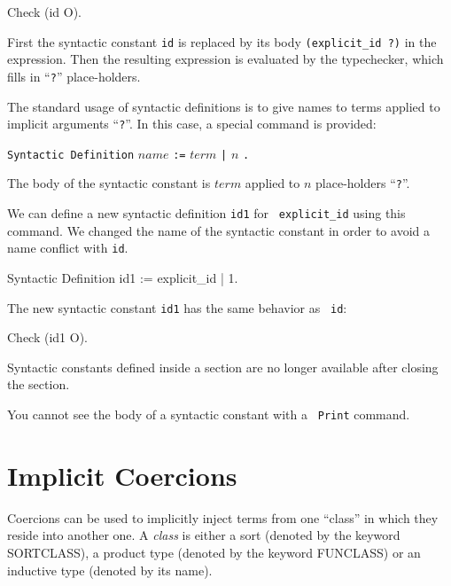 {\begin{coq_example}
\begin{coq_example}
Check (id O).
\end{coq_example}

\noindent First the syntactic constant {\tt id} is replaced by its
body {\tt (explicit\_id ?)} in the expression. Then the resulting
expression is evaluated by the typechecker, which fills in
``\verb+?+'' place-holders.

The standard usage of syntactic definitions is to give names to terms
applied to implicit arguments ``\verb+?+''. In this case, a special
command is provided:

\begin{center}
\verb+Syntactic Definition+ $name$ \verb+:=+ $term$ \verb+|+ $n$ \verb+.+ \\
\end{center}

\noindent The body of the syntactic constant is $term$ applied to $n$
place-holders ``\verb+?+''.

We can define a new syntactic definition {\tt id1} for {\tt
  explicit\_id} using this command. We changed the name of the
syntactic constant in order to avoid a name conflict with {\tt id}.

\begin{coq_example}
Syntactic Definition id1 := explicit_id | 1.
\end{coq_example}

The new syntactic constant {\tt id1} has the same behavior as {\tt
  id}:

\begin{coq_example}
Check (id1 O).
\end{coq_example}


\begin{Warnings}
\item Syntactic constants defined inside a section are no longer
  available after closing the section.
\item You cannot see the body of a syntactic constant with a {\tt
    Print} command.
\end{Warnings}

\section{Implicit Coercions}
\label{Coercions}

Coercions can be used to implicitly inject terms from one ``class'' in
which they reside into another one. A {\em class} is either a sort
(denoted by the keyword SORTCLASS), a product type (denoted by the
keyword FUNCLASS) or an inductive type (denoted by its name).


\end{coq_example}}

